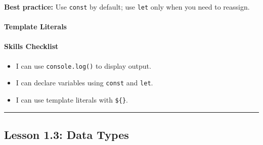 \documentclass[
  justified,
  openright,
]{tufte-book}
\let\subsubsection\paragraph
\let\paragraph\paragraph
\newcommand{\BuiltInTok}[1]{#1}
\newcommand{\CommentTok}[1]{\textcolor{MidGray}{#1}}
\newcommand{\DecValTok}[1]{\textcolor{Purple}{#1}}
\newcommand{\FunctionTok}[1]{\textcolor{BrandBlue}{#1}}
\newcommand{\KeywordTok}[1]{\textcolor{BrandBlue}{#1}}
\newcommand{\NormalTok}[1]{#1}
\newcommand{\OperatorTok}[1]{\textcolor{DarkGray}{#1}}
\newcommand{\SpecialCharTok}[1]{\textcolor{Teal}{#1}}
\newcommand{\StringTok}[1]{\textcolor{Teal}{#1}}
\newcommand{\VerbatimStringTok}[1]{\textcolor{Teal}{#1}}
\newenvironment{Shaded}{%
  \begin{snugshade}
}{%
  \end{snugshade}
}
\let\subsubsection\paragraph
\let\paragraph\paragraph
\providecommand{\tightlist}{%
  \setlength{\itemsep}{0pt}\setlength{\parskip}{0pt}}
\begin{document}
\textbf{Best practice:} Use \texttt{const} by default; use \texttt{let}
only when you need to reassign.

\subsubsection{Template Literals}\label{template-literals}

\begin{Shaded}
\end{Shaded}

\subsubsection{Skills Checklist}\label{skills-checklist-2}

\begin{itemize}
\tightlist
\item[$\square$]
  I can use \texttt{console.log()} to display output.
\item[$\square$]
  I can declare variables using \texttt{const} and \texttt{let}.
\item[$\square$]
  I can use template literals with \texttt{\$\{\}}.
\end{itemize}

\begin{center}\rule{0.5\linewidth}{0.5pt}\end{center}

\subsection{Lesson 1.3: Data Types}\label{lesson-1.3-data-types}
\end{document}
